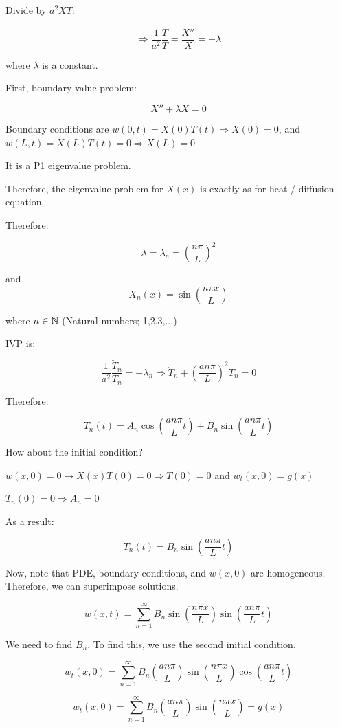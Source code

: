 \documentclass{article}
\begin{document}
Divide by $a^2 X T$:

$$\Rightarrow \frac{1}{a^2} \frac{\ddot T}{T} = \frac{X''}{X} = - \lambda$$

where $\lambda$ is a constant. 

First, boundary value problem:

$$X'' + \lambda X = 0$$

Boundary conditions are $w(0,t) = X(0) T(t) \Rightarrow X(0) = 0$, and $w(L,t) = X(L) T(t) = 0 \Rightarrow X(L) = 0$

It is a P1 eigenvalue problem. 

Therefore, the eigenvalue problem for $X(x)$ is exactly as for heat / diffusion equation. 

Therefore:

$$\lambda = \lambda_n = \left( \frac{n \pi}{L} \right)^2$$

and $$X_n (x) = \sin \left(\frac{n \pi x}{L} \right)$$

where $n \in \mathbb{N}$ (Natural numbers; 1,2,3,...)

IVP is:

$$\frac{1}{a^2} \frac{\ddot{T}_n}{T_n} = -\lambda_n \Rightarrow \ddot{T}_n + \left( \frac{a n \pi}{L} \right)^2 T_n = 0$$

Therefore:

$$T_n(t) = A_n \cos \left(\frac{a n \pi}{L} t \right) + B_n \sin \left(\frac{a n \pi}{L} t \right)$$

How about the initial condition?

$w(x,0) = 0 \longrightarrow X(x) T(0) = 0 \Rightarrow T(0) = 0$ and $w_t (x,0) = g(x)$

$T_n (0) = 0 \Rightarrow A_n = 0$

\hfill

As a result:

$$T_n(t) = B_n \sin \left(\frac{a n \pi}{L} t \right)$$

Now, note that PDE, boundary conditions, and $w(x,0)$ are homogeneous. Therefore, we can superimpose solutions. 

$$w(x,t) = \sum_{n = 1}^\infty B_n \sin \left(\frac{n \pi x}{L} \right) \sin \left(\frac{a n \pi}{L} t \right)$$

We need to find $B_n$. To find this, we use the second initial condition. 

$$w_t (x,0) = \sum_{n = 1}^\infty B_n \left(\frac{a n \pi}{L} \right)  \sin \left(\frac{n \pi x}{L} \right) \cos \left(\frac{a n \pi}{L} t \right)$$

$$w_t (x,0) = \sum_{n = 1}^\infty B_n \left(\frac{a n \pi}{L} \right) \sin \left( \frac{n \pi x}{L} \right) = g(x)$$
\end{document}

